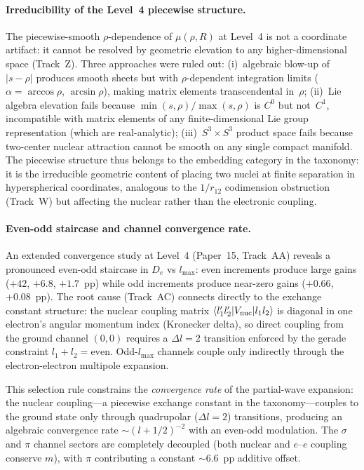 \documentclass[aps,pra,twocolumn,superscriptaddress,longbibliography]{revtex4-2}
\begin{document}
\paragraph{Irreducibility of the Level~4 piecewise structure.}
The piecewise-smooth $\rho$-dependence of $\mu(\rho,R)$ at Level~4
is not a coordinate artifact: it cannot be resolved by geometric
elevation to any higher-dimensional space (Track~Z).  Three approaches
were ruled out: (i)~algebraic blow-up of $|s - \rho|$ produces smooth
sheets but with $\rho$-dependent integration limits ($\alpha = \arccos\rho$,
$\arcsin\rho$), making matrix elements transcendental in~$\rho$;
(ii)~Lie algebra elevation fails because $\min(s,\rho)/\max(s,\rho)$
is $C^0$ but not~$C^1$, incompatible with matrix elements of any
finite-dimensional Lie group representation (which are real-analytic);
(iii)~$S^3 \times S^3$ product space fails because two-center nuclear
attraction cannot be smooth on any single compact manifold.
The piecewise structure thus belongs to the embedding category
in the taxonomy: it is the irreducible geometric content of placing
two nuclei at finite separation in hyperspherical coordinates, analogous
to the $1/r_{12}$ codimension obstruction (Track~W) but affecting the
nuclear rather than the electronic coupling.

\paragraph{Even-odd staircase and channel convergence rate.}
An extended convergence study at Level~4 (Paper~15, Track~AA)
reveals a pronounced even-odd staircase in $D_e$ vs $l_{\max}$:
even increments produce large gains ($+42$, $+6.8$, $+1.7$~pp)
while odd increments produce near-zero gains ($+0.66$, $+0.08$~pp).
The root cause (Track~AC) connects directly to the exchange constant
structure: the nuclear coupling matrix
$\langle l_1' l_2' | V_{\rm nuc} | l_1 l_2 \rangle$ is diagonal
in one electron's angular momentum index (Kronecker delta), so
direct coupling from the ground channel $(0,0)$ requires a
$\Delta l = 2$ transition enforced by the gerade constraint
$l_1 + l_2 = \text{even}$.  Odd-$l_{\max}$ channels couple only
indirectly through the electron-electron multipole expansion.

This selection rule constrains the \emph{convergence rate} of the
partial-wave expansion: the nuclear coupling---a piecewise exchange
constant in the taxonomy---couples to the ground state only through
quadrupolar ($\Delta l = 2$) transitions, producing an algebraic
convergence rate $\sim (l + 1/2)^{-2}$ with an even-odd modulation.
The $\sigma$ and $\pi$ channel sectors are completely decoupled
(both nuclear and $e$--$e$ coupling conserve $m$), with $\pi$
contributing a constant ${\sim}6.6$~pp additive offset.
\end{document}

